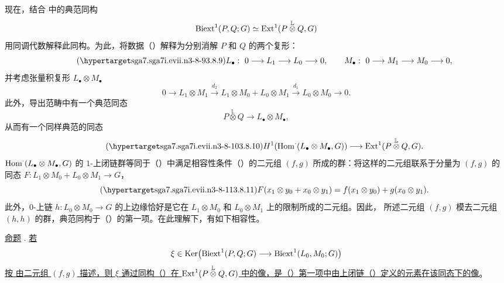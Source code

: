 现在，结合  中的典范同构
\[
 \operatorname{Biext}^1(P,Q;G)\simeq
 \operatorname{Ext}^1(P\mathbin{\overset{\mathbb L}{\otimes}}Q,G)
\]
用同调代数解释此同构。为此，将数据（）解释为分别消解 $P$ 和 $Q$ 的两个复形：
\begin{equation}\tag{\SGARefTarget{sga7.sga7i.evii.n3-8-9}{3.8.9}}
 L_\bullet:\ 0\longrightarrow L_1\longrightarrow L_0
 \longrightarrow0,\qquad
 M_\bullet:\ 0\longrightarrow M_1\longrightarrow M_0
 \longrightarrow0,
\end{equation}
并考虑张量积复形 $L_\bullet\otimes M_\bullet$
\[
 0\longrightarrow L_1\otimes M_1
 \xrightarrow{d_2}
 L_1\otimes M_0+L_0\otimes M_1
 \xrightarrow{d_1}
 L_0\otimes M_0\longrightarrow0.
\]
此外，导出范畴中有一个典范同态
\[
 P\mathbin{\overset{\mathbb L}{\otimes}}Q
 \longrightarrow L_\bullet\otimes M_\bullet,
\]
从而有一个同样典范的同态
\begin{equation}\tag{\SGARefTarget{sga7.sga7i.evii.n3-8-10}{3.8.10}}
 H^1\!\left(\Hom^{\cdot}(L_\bullet\otimes M_\bullet,G)\right)
 \longrightarrow
 \Ext^1(P\mathbin{\overset{\mathbb L}{\otimes}}Q,G).
\end{equation}
$\operatorname{Hom}^{\cdot}(L_\bullet\otimes M_\bullet,G)$ 的 $1$-上闭链群等同于（）中满足相容性条件（）的二元组 $(f,g)$ 所成的群：将这样的二元组联系于分量为 $(f,g)$ 的同态 $F:L_1\otimes M_0+L_0\otimes M_1\longrightarrow G$，
\begin{equation}\tag{\SGARefTarget{sga7.sga7i.evii.n3-8-11}{3.8.11}}
 F(x_1\otimes y_0+x_0\otimes y_1)
 =f(x_1\otimes y_0)+g(x_0\otimes y_1).
\end{equation}
此外，$0$-上链 $h:L_0\otimes M_0\longrightarrow G$ 的上边缘恰好是它在 $L_1\otimes M_0$ 和 $L_0\otimes M_1$ 上的限制所成的二元组。因此， 所述二元组 $(f,g)$ 模去二元组 $(h,h)$ 的群，典范同构于（）的第一项。在此理解下，有如下相容性。

\underline{命题} .
\underline{若}
\[
 \xi\in\operatorname{Ker}\!\left(
 \operatorname{Biext}^1(P,Q;G)\longrightarrow\operatorname{Biext}^1(L_0,M_0;G)\right)
\]
\underline{按  由二元组 $(f,g)$ 描述，则 $\xi$ 通过同构（）在 $\operatorname{Ext}^1(P\mathbin{\overset{\mathbb L}{\otimes}}Q,G)$ 中的像，是（）第一项中由上闭链（）定义的元素在该同态下的像}。

